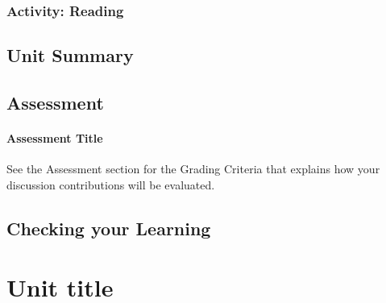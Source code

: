 \documentclass[
]{book}
\begin{document}
\hypertarget{activity-reading-2}{%
\subsection*{Activity: Reading}\label{activity-reading-2}}

\begin{reflect}

\end{reflect}

\hypertarget{unit-summary-2}{%
\section*{Unit Summary}\label{unit-summary-2}}

\hypertarget{assessment-3}{%
\section*{Assessment}\label{assessment-3}}

\begin{assessment}
\hypertarget{assessment-title}{%
\subsubsection*{Assessment Title}\label{assessment-title}}

See the Assessment section for the Grading Criteria that explains how
your discussion contributions will be evaluated.
\end{assessment}

\hypertarget{checking-your-learning-3}{%
\section*{Checking your Learning}\label{checking-your-learning-3}}

\begin{progress}

\end{progress}

\hypertarget{unit-title-4}{%
\chapter{Unit title}\label{unit-title-4}}
\end{document}
